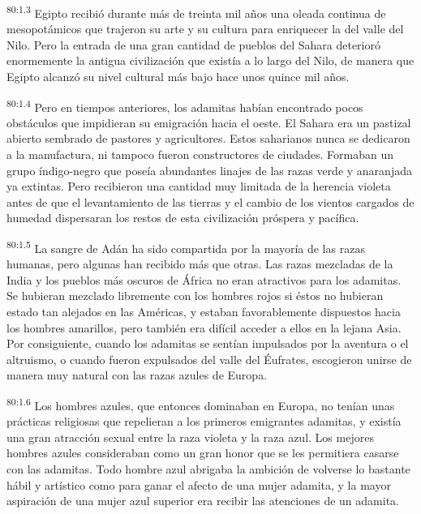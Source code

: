 \par
\textsuperscript{80:1.3} Egipto recibió durante más de treinta mil años una oleada continua de mesopotámicos que trajeron su arte y su cultura para enriquecer la del valle del Nilo. Pero la entrada de una gran cantidad de pueblos del Sahara deterioró enormemente la antigua civilización que existía a lo largo del Nilo, de manera que Egipto alcanzó su nivel cultural más bajo hace unos quince mil años.

\par
\textsuperscript{80:1.4} Pero en tiempos anteriores, los adamitas habían encontrado pocos obstáculos que impidieran su emigración hacia el oeste. El Sahara era un pastizal abierto sembrado de pastores y agricultores. Estos saharianos nunca se dedicaron a la manufactura, ni tampoco fueron constructores de ciudades. Formaban un grupo índigo-negro que poseía abundantes linajes de las razas verde y anaranjada ya extintas. Pero recibieron una cantidad muy limitada de la herencia violeta antes de que el levantamiento de las tierras y el cambio de los vientos cargados de humedad dispersaran los restos de esta civilización próspera y pacífica.

\par
\textsuperscript{80:1.5} La sangre de Adán ha sido compartida por la mayoría de las razas humanas, pero algunas han recibido más que otras. Las razas mezcladas de la India y los pueblos más oscuros de África no eran atractivos para los adamitas. Se hubieran mezclado libremente con los hombres rojos si éstos no hubieran estado tan alejados en las Américas, y estaban favorablemente dispuestos hacia los hombres amarillos, pero también era difícil acceder a ellos en la lejana Asia. Por consiguiente, cuando los adamitas se sentían impulsados por la aventura o el altruismo, o cuando fueron expulsados del valle del Éufrates, escogieron unirse de manera muy natural con las razas azules de Europa.

\par
\textsuperscript{80:1.6} Los hombres azules, que entonces dominaban en Europa, no tenían unas prácticas religiosas que repelieran a los primeros emigrantes adamitas, y existía una gran atracción sexual entre la raza violeta y la raza azul. Los mejores hombres azules consideraban como un gran honor que se les permitiera casarse con las adamitas. Todo hombre azul abrigaba la ambición de volverse lo bastante hábil y artístico como para ganar el afecto de una mujer adamita, y la mayor aspiración de una mujer azul superior era recibir las atenciones de un adamita.

